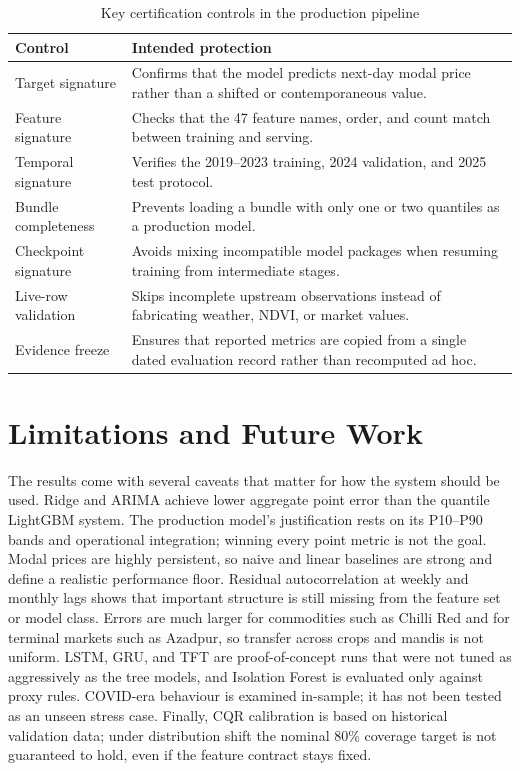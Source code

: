 \documentclass[a4paper,conference]{IEEEtran}
\begin{document}
\begin{table}[t]
\caption{Key certification controls in the production pipeline}
\label{tab:certification}
\centering
\small
\begin{tabular}{@{}p{}p{}@{}}
\toprule
Control & Intended protection \\
\midrule
Target signature & Confirms that the model predicts next-day modal price rather than a shifted or contemporaneous value. \\
Feature signature & Checks that the 47 feature names, order, and count match between training and serving. \\
Temporal signature & Verifies the 2019--2023 training, 2024 validation, and 2025 test protocol. \\
Bundle completeness & Prevents loading a bundle with only one or two quantiles as a production model. \\
Checkpoint signature & Avoids mixing incompatible model packages when resuming training from intermediate stages. \\
Live-row validation & Skips incomplete upstream observations instead of fabricating weather, NDVI, or market values. \\
Evidence freeze & Ensures that reported metrics are copied from a single dated evaluation record rather than recomputed ad hoc. \\
\bottomrule
\end{tabular}
\end{table}

\section{Limitations and Future Work}
The results come with several caveats that matter for how the system should be used. Ridge and ARIMA achieve lower aggregate point error than the quantile LightGBM system. The production model's justification rests on its P10--P90 bands and operational integration; winning every point metric is not the goal. Modal prices are highly persistent, so naive and linear baselines are strong and define a realistic performance floor. Residual autocorrelation at weekly and monthly lags shows that important structure is still missing from the feature set or model class. Errors are much larger for commodities such as Chilli Red and for terminal markets such as Azadpur, so transfer across crops and mandis is not uniform. LSTM, GRU, and TFT are proof-of-concept runs that were not tuned as aggressively as the tree models, and Isolation Forest is evaluated only against proxy rules. COVID-era behaviour is examined in-sample; it has not been tested as an unseen stress case. Finally, CQR calibration is based on historical validation data; under distribution shift the nominal 80\% coverage target is not guaranteed to hold, even if the feature contract stays fixed.
\end{document}
